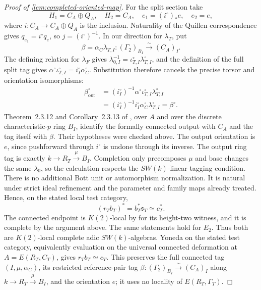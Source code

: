 \documentclass[11pt]{article}
\numberwithin{equation}{section}
\theoremstyle{definition}
\theoremstyle{remark}
\begin{document}
\begin{proof}[Proof of \cref{lem:completed-oriented-map}]
For the split section take
\[
 H_1=C_A\oplus Q_A,\quad H_2=C_A,\quad
 e_1=(i^\circ)_*e,\quad e_2=e,
\]
where \(i:C_A\to C_A\oplus Q_A\) is the inclusion. Naturality of the
Quillen correspondence gives \(q_{e_1}=i^\circ q_e\), so
\(j=(i^\circ)^{-1}\). In our direction for \(\lambda_T\), put
\[
 \beta=\alpha_C\lambda_{T,I}:
       (\Gamma_2)_{B_I}\xrightarrow{\sim}(C_A)_I .
\]
The defining relation for \(\lambda_F\) gives
\(\lambda_{0,I}^{-1}=\iota_{T,I}^\circ\lambda_{T,I}^\circ\), and the
definition of the full split tag gives
\(\alpha^\circ\iota_{T,I}^\circ=i_I^\circ\alpha_C^\circ\).
Substitution therefore cancels the precise torsor and orientation
isomorphisms:
\[
 \begin{aligned}
 \beta_{\mathrm{out}}^\circ
  &=(i_I^\circ)^{-1}\alpha^\circ
       \iota_{T,I}^\circ\lambda_{T,I}^\circ\\
  &=(i_I^\circ)^{-1}i_I^\circ
       \alpha_C^\circ\lambda_{T,I}^\circ
    =\beta^\circ .
 \end{aligned}
\]
Theorem~2.3.12 and Corollary~2.3.13 of \cite{LurieEllipticII2018}, over
\(A\) and over the discrete characteristic-\(p\) ring \(B_I\), identify
the formally connected output with \(C_A\) and the tag itself with
\(\beta\). Their hypotheses were checked above. The output orientation
is \(e\), since pushforward through \(i^\circ\) is undone through its
inverse. The output ring tag is exactly
\(k\to R_T\xrightarrow{\mu}B_I\). Completion only precomposes \(\mu\)
and base changes the same \(\lambda_0\), so the calculation respects the
\(SW(k)\)-linear tagging condition. There is no additional Bott unit or
automorphism normalization. It is natural under strict ideal refinement
and the parameter and family maps already treated. Hence, on the stated
local test category,
\[
 (r_Tb_T)^*=b_T^*\mathfrak s_T\simeq c_T^*.
\]
The connected endpoint is \(K(2)\)-local by
\cite[Proposition~4.4.2]{BMR2026} for its height-two witness, and it is
complete by the argument above. The same statements hold for \(E_2\).
Thus both are \(K(2)\)-local complete adic \(SW(k)\)-algebras.
Yoneda on the stated test category, equivalently evaluation on the universal connected deformation at
\(A=E(R_T,C_T)\), gives \(r_Tb_T\simeq c_T\). This preserves the full
connected tag \((I,\mu,\alpha_C)\), its restricted reference-pair tag
\(\beta:(\Gamma_2)_{B_I}\xrightarrow{\sim}(C_A)_I\) along
\(k\to R_T\xrightarrow{\mu}B_I\), and the orientation \(e\); it uses
no locality of \(E(R_T,\Gamma_T)\).



\end{proof}
\end{document}
